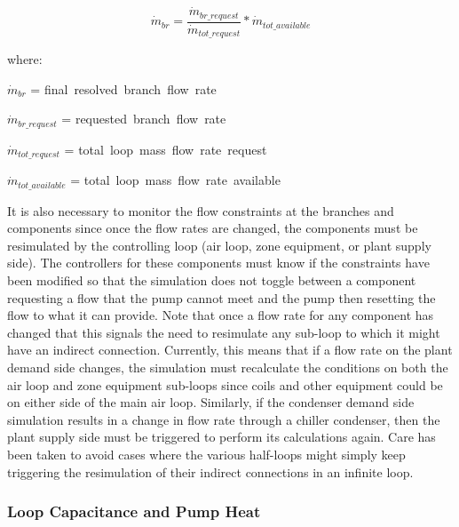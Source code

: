 \begin{equation}
{\dot m_{br}} = \frac{{{{\dot m}_{br\_request}}}}{{{{\dot m}_{tot\_request}}}}*{\dot m_{tot\_available}}
\end{equation}

where:

\( \dot m_{br} \) = \rm{ final~resolved~branch~flow~rate}

\( \dot m_{br\_request} \) = \rm{ requested~branch~flow~rate }

\( \dot m_{tot\_request} \) = \rm{ total~loop~mass~flow~rate~request}

\( \dot m_{tot\_available} \) = \rm{ total~loop~mass~flow~rate~available}

It is also necessary to monitor the flow constraints at the branches and components since once the flow rates are changed, the components must be resimulated by the controlling loop (air loop, zone equipment, or plant supply side). The controllers for these components must know if the constraints have been modified so that the simulation does not toggle between a component requesting a flow that the pump cannot meet and the pump then resetting the flow to what it can provide. Note that once a flow rate for any component has changed that this signals the need to resimulate any sub-loop to which it might have an indirect connection. Currently, this means that if a flow rate on the plant demand side changes, the simulation must recalculate the conditions on both the air loop and zone equipment sub-loops since coils and other equipment could be on either side of the main air loop. Similarly, if the condenser demand side simulation results in a change in flow rate through a chiller condenser, then the plant supply side must be triggered to perform its calculations again. Care has been taken to avoid cases where the various half-loops might simply keep triggering the resimulation of their indirect connections in an infinite loop.

\subsubsection{Loop Capacitance and Pump Heat}\label{loop-capacitance-and-pump-heat}

